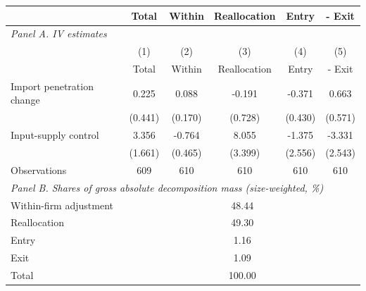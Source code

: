 \begin{tabular}{l*{5}{c}}
\toprule
 & Total & Within & Reallocation & Entry & - Exit \\
\midrule
\multicolumn{6}{l}{\textit{Panel A. IV estimates}} \\
                &\multicolumn{1}{c}{(1)}&\multicolumn{1}{c}{(2)}&\multicolumn{1}{c}{(3)}&\multicolumn{1}{c}{(4)}&\multicolumn{1}{c}{(5)}\\
                &\multicolumn{1}{c}{Total}&\multicolumn{1}{c}{Within}&\multicolumn{1}{c}{Reallocation}&\multicolumn{1}{c}{Entry}&\multicolumn{1}{c}{- Exit}\\
\midrule
Import penetration change&    0.225         &    0.088         &   -0.191         &   -0.371         &    0.663         \\
                &  (0.441)         &  (0.170)         &  (0.728)         &  (0.430)         &  (0.571)         \\
Input-supply control&    3.356\sym{**} &   -0.764         &    8.055\sym{**} &   -1.375         &   -3.331         \\
                &  (1.661)         &  (0.465)         &  (3.399)         &  (2.556)         &  (2.543)         \\
\midrule
Observations    &      609         &      610         &      610         &      610         &      610         \\
\midrule
\multicolumn{6}{l}{\textit{Panel B. Shares of gross absolute decomposition mass (size-weighted, \%)}} \\
\addlinespace[2pt]
Within-firm adjustment & \multicolumn{5}{c}{ 48.44} \\
Reallocation & \multicolumn{5}{c}{ 49.30} \\
Entry & \multicolumn{5}{c}{  1.16} \\
Exit & \multicolumn{5}{c}{  1.09} \\
\midrule
Total & \multicolumn{5}{c}{100.00} \\
\bottomrule
\end{tabular}
